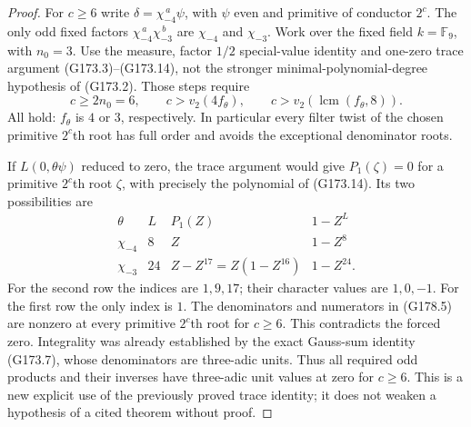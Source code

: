 \begin{proof}
For $c\geq6$ write $\delta=\chi_{-4}^{\,a}\psi$, with $\psi$ even
and primitive of conductor $2^c$.  The only odd fixed factors
$\chi_{-4}^{\,a}\chi_{-3}^{\,b}$ are $\chi_{-4}$ and $\chi_{-3}$.
Work over the fixed field $k=\mathbb F_9$, with $n_0=3$.
Use the measure, factor $1/2$ special-value identity and one-zero
trace argument (G173.3)--(G173.14), not the stronger
minimal-polynomial-degree hypothesis of (G173.2).
Those steps require
\[
 c\geq2n_0=6,\qquad c>v_2(4f_\theta),\qquad
                         c>v_2(\operatorname{lcm}(f_\theta,8)).
 \tag{G178.4}
\]
All hold: $f_\theta$ is $4$ or $3$, respectively.
In particular every filter twist of the chosen primitive $2^c$th root
has full order and avoids the exceptional denominator roots.

If $L(0,\theta\psi)$ reduced to zero, the trace argument would give
$P_1(\zeta)=0$ for a primitive $2^c$th root $\zeta$, with precisely
the polynomial of (G173.14).  Its two possibilities are
\[
 \begin{array}{c|c|c|c}
 \theta&L& P_1(Z)&1-Z^L\\ \hline
 \chi_{-4}&8&Z&1-Z^8\\
 \chi_{-3}&24&Z-Z^{17}=Z(1-Z^{16})&1-Z^{24}.
 \end{array}\tag{G178.5}
\]
For the second row the indices are $1,9,17$; their character values
are $1,0,-1$.  For the first row the only index is $1$.
The denominators and numerators in (G178.5) are nonzero at
every primitive $2^c$th root for $c\geq6$.
This contradicts the forced zero.  Integrality was already established
by the exact Gauss-sum identity (G173.7), whose denominators are
three-adic units.  Thus all required odd products and their inverses
have three-adic unit values at zero for $c\geq6$.
This is a new explicit use of the previously proved trace identity;
it does not weaken a hypothesis of a cited theorem without proof.


\end{proof}
